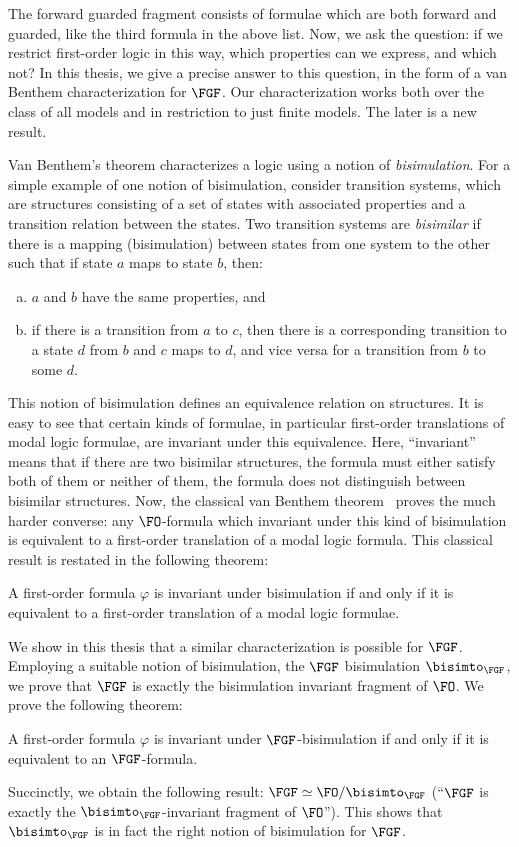 The forward guarded fragment consists of formulae which are both forward and guarded, like the third formula in the above list.
Now, we ask the question: if we restrict first-order logic in this way, which properties can we express, and which not?
In this thesis, we give a precise answer to this question, in the form of a van Benthem characterization for $\FGF$.
Our characterization works both over the class of all models and in restriction to just finite models.
The later is a new result.

Van Benthem's theorem characterizes a logic using a notion of \emph{bisimulation}.
For a simple example of one notion of bisimulation, consider transition systems, which are structures consisting of a set of states with associated properties and a transition relation between the states.
Two transition systems are \emph{bisimilar} if there is a mapping (bisimulation) between states from one system to the other such that if state $a$ maps to state $b$, then:
\begin{enumerate}[(a)]
  \item $a$ and $b$ have the same properties, and
  \item if there is a transition from $a$ to $c$, then there is a corresponding transition to a state $d$ from $b$ and $c$ maps to $d$, and vice versa for a transition from $b$ to some $d$.
\end{enumerate}
This notion of bisimulation defines an equivalence relation on structures.
It is easy to see that certain kinds of formulae, in particular first-order translations of modal logic formulae, are invariant under this equivalence.
Here, ``invariant'' means that if there are two bisimilar structures, the formula must either satisfy both of them or neither of them, \ie{} the formula does not distinguish between bisimilar structures.
Now, the classical van Benthem theorem~\cite{van1983modal} proves the much harder converse: any $\FO$-formula which invariant under this kind of bisimulation is equivalent to a first-order translation of a modal logic formula.
This classical result is restated in the following theorem:
\begin{theorem}
  A first-order formula $\varphi$ is invariant under bisimulation if and only if it is equivalent to a first-order translation of a modal logic formulae.
\end{theorem}

We show in this thesis that a similar characterization is possible for $\FGF$.
Employing a suitable notion of bisimulation, the $\FGF$ bisimulation $\bisimto_{\FGF}$, we prove that $\FGF$ is exactly the bisimulation invariant fragment of $\FO$.
We prove the following theorem:
\begin{theorem}\label{thm:invariance-iff-fgf}
  A first-order formula $\varphi$ is invariant under $\FGF$-bisimulation if and only if it is equivalent to an $\FGF$-formula.
\end{theorem}
Succinctly, we obtain the following result: $\FGF \simeq \FO/{\bisimto_{\FGF}}$ (``$\FGF$ is exactly the $\bisimto_{\FGF}$-invariant fragment of $\FO$'').
This shows that $\bisimto_{\FGF}$ is in fact the right notion of bisimulation for $\FGF$.

